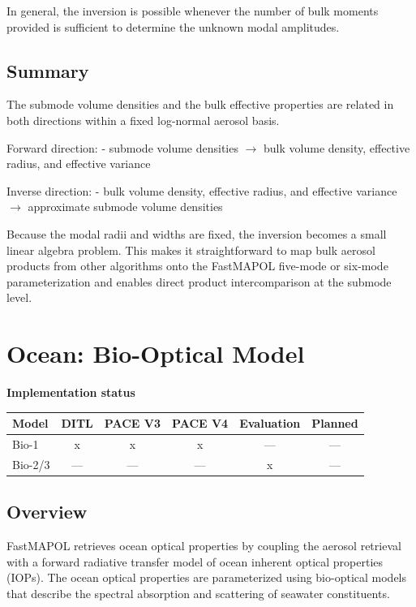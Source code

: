 \documentclass[
  11pt,
  letterpaper,
]{scrreprt}
\begin{document}
In general, the inversion is possible whenever the number of bulk
moments provided is sufficient to determine the unknown modal
amplitudes.

\section{Summary}\label{summary-3}

The submode volume densities and the bulk effective properties are
related in both directions within a fixed log-normal aerosol basis.

Forward direction: - submode volume densities \(\rightarrow\) bulk
volume density, effective radius, and effective variance

Inverse direction: - bulk volume density, effective radius, and
effective variance \(\rightarrow\) approximate submode volume densities

Because the modal radii and widths are fixed, the inversion becomes a
small linear algebra problem. This makes it straightforward to map bulk
aerosol products from other algorithms onto the FastMAPOL five-mode or
six-mode parameterization and enables direct product intercomparison at
the submode level.

\chapter{Ocean: Bio-Optical Model}\label{sec-ocean-model}

\textbf{Implementation status}

\begin{longtable}[]{@{}lccccc@{}}
\toprule\noalign{}
Model & DITL & PACE V3 & PACE V4 & Evaluation & Planned \\
\midrule\noalign{}
\endhead
\bottomrule\noalign{}
\endlastfoot
Bio-1 & x & x & x & --- & --- \\
Bio-2/3 & --- & --- & --- & x & --- \\
\end{longtable}

\section{Overview}\label{overview-3}

FastMAPOL retrieves ocean optical properties by coupling the aerosol
retrieval with a forward radiative transfer model of ocean inherent
optical properties (IOPs). The ocean optical properties are
parameterized using bio-optical models that describe the spectral
absorption and scattering of seawater constituents.
\end{document}

